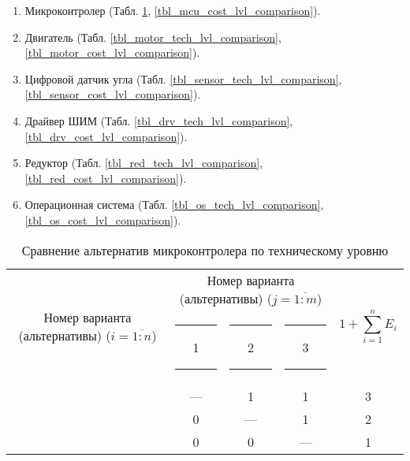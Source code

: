 \begin{enumerate}
    \item Микроконтролер (Табл.
        \ref{tbl_mcu_tech_lvl_comparison},
        \ref{tbl_mcu_cost_lvl_comparison}).

    \item Двигатель (Табл.
        \ref{tbl_motor_tech_lvl_comparison},
        \ref{tbl_motor_cost_lvl_comparison}).

    \item Цифровой датчик угла (Табл.
        \ref{tbl_sensor_tech_lvl_comparison},
        \ref{tbl_sensor_cost_lvl_comparison}).

    \item Драйвер ШИМ (Табл.
        \ref{tbl_drv_tech_lvl_comparison},
        \ref{tbl_drv_cost_lvl_comparison}).

    \item Редуктор (Табл.
        \ref{tbl_red_tech_lvl_comparison},
        \ref{tbl_red_cost_lvl_comparison}).

    \item Операционная система (Табл.
        \ref{tbl_os_tech_lvl_comparison},
        \ref{tbl_os_cost_lvl_comparison}).

\end{enumerate}

\begin{table}[H]
    \centering
    \begin{tabular}{|c|c|c|c|c|}
        \hline
        \multirow{2}{2.4cm}[-0.5pc]{
            \centering
            Номер варианта (альтернативы) ($i = \overline{1:n}$)
        } &
        \multicolumn{3}{c|}{
            \parbox[t]{2.4cm}{
                \centering
                Номер варианта (альтернативы) ($j = \overline{1:m}$)
            }
        } &
        \multirow{2}{1.7cm}{
            \centering
            $$1 + \sum_{i=1}^n E_i$$
        } \\
        &
        \centering \rule{2pt}{0pt} 1 \rule{2pt}{0pt} &
        \centering \rule{2pt}{0pt} 2 \rule{2pt}{0pt} &
        \centering \rule{2pt}{0pt} 3 \rule{2pt}{0pt} & \\
        \hline \hline
        \centering{1} &---& 1 & 1 & 3 \\ \hline
        \centering{2} & 0 &---& 1 & 2 \\ \hline
        \centering{3} & 0 & 0 &---& 1 \\ \hline
    \end{tabular}
    \caption{Сравнение альтернатив микроконтролера по техническому уровню}
    \label{tbl_mcu_tech_lvl_comparison}
\end{table}


